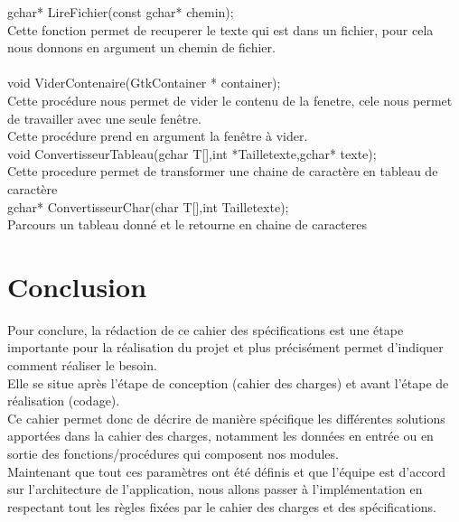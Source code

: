 \documentclass[a4]{article}
\begin{document}
		
	gchar* LireFichier(const gchar* chemin);\\
		Cette fonction permet de recuperer le texte qui est dans un fichier, pour cela nous donnons en argument un chemin de fichier.\\
	
	\\
	
	void ViderContenaire(GtkContainer * container);\\
		Cette procédure nous permet de vider le contenu de la fenetre, cele nous permet de travailler avec une seule fenêtre.\\
		Cette procédure prend en argument la fenêtre à vider.\\
	
	void ConvertisseurTableau(gchar T[],int *Tailletexte,gchar* texte);\\
		Cette procedure permet de transformer une chaine de caractère en tableau de caractère\\
	 
	gchar* ConvertisseurChar(char T[],int Tailletexte); \\
		Parcours un tableau donné et le retourne en chaine de caracteres\\
		
	
	\section{Conclusion}
	
	Pour conclure, la rédaction de ce cahier des spécifications est une étape importante pour la réalisation du projet
	et plus précisément permet d'indiquer comment réaliser le besoin.\\
	
	Elle se situe après l'étape de conception (cahier des charges) et avant l'étape de réalisation (codage).\\
	
	Ce cahier permet donc de décrire de manière spécifique les différentes solutions apportées dans la cahier des charges, notamment les données en entrée
	ou en sortie des fonctions/procédures qui composent nos modules.\\
	
	Maintenant que tout ces paramètres ont été définis et que l'équipe est d'accord sur l'architecture de l'application, nous allons
	passer à l'implémentation en respectant tout les règles fixées par le cahier des charges et des spécifications.
	
\end{document}
